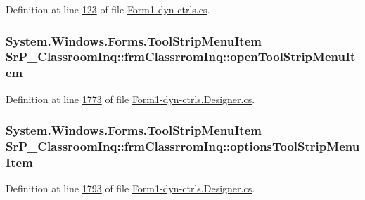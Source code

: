 \-Definition at line \hyperlink{_form1-dyn-ctrls_8cs_source_l00123}{123} of file \hyperlink{_form1-dyn-ctrls_8cs_source}{\-Form1-\/dyn-\/ctrls.\-cs}.

\hypertarget{class_sr_p___classroom_inq_1_1frm_classrrom_inq_aabb3ca13577ddb31c75bcd459c075263}{
\subsubsection[{open\-Tool\-Strip\-Menu\-Item}]{\setlength{\rightskip}{0pt plus 5cm}\-System.\-Windows.\-Forms.\-Tool\-Strip\-Menu\-Item {\bf \-Sr\-P\-\_\-\-Classroom\-Inq\-::frm\-Classrrom\-Inq\-::open\-Tool\-Strip\-Menu\-Item}}}
\label{class_sr_p___classroom_inq_1_1frm_classrrom_inq_aabb3ca13577ddb31c75bcd459c075263}


\-Definition at line \hyperlink{_form1-dyn-ctrls_8_designer_8cs_source_l01773}{1773} of file \hyperlink{_form1-dyn-ctrls_8_designer_8cs_source}{\-Form1-\/dyn-\/ctrls.\-Designer.\-cs}.

\hypertarget{class_sr_p___classroom_inq_1_1frm_classrrom_inq_acdc1111ba8acc3bb1ee140845f069521}{
\subsubsection[{options\-Tool\-Strip\-Menu\-Item}]{\setlength{\rightskip}{0pt plus 5cm}\-System.\-Windows.\-Forms.\-Tool\-Strip\-Menu\-Item {\bf \-Sr\-P\-\_\-\-Classroom\-Inq\-::frm\-Classrrom\-Inq\-::options\-Tool\-Strip\-Menu\-Item}}}
\label{class_sr_p___classroom_inq_1_1frm_classrrom_inq_acdc1111ba8acc3bb1ee140845f069521}


\-Definition at line \hyperlink{_form1-dyn-ctrls_8_designer_8cs_source_l01793}{1793} of file \hyperlink{_form1-dyn-ctrls_8_designer_8cs_source}{\-Form1-\/dyn-\/ctrls.\-Designer.\-cs}.

